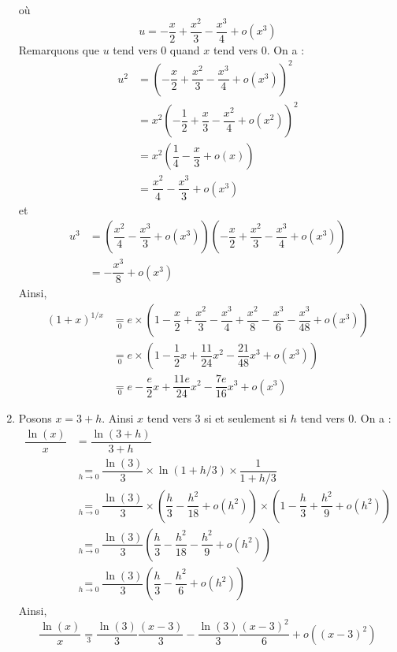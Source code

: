 \documentclass[a4paper,10pt]{report}
\begin{document}
\begin{enumerate}
 où 
 $$u = -\dfrac{x}{2} + \dfrac{x^2}{3} - \dfrac{x^3}{4} + o(x^3)$$
 Remarquons que $u$ tend vers $0$ quand $x$ tend vers $0$. On a :
 \begin{align*}
 u^2 & = \left(-\dfrac{x}{2} + \dfrac{x^2}{3} - \dfrac{x^3}{4} + o(x^3)\right)^2\\
 &  = x^2  \left(-\dfrac{1}{2} + \dfrac{x}{3} - \dfrac{x^2}{4} + o(x^2)\right)^2 \\
 & = x^2 \left( \dfrac{1}{4} - \dfrac{x}{3} + o(x) \right) \\
 & = \dfrac{x^2}{4} - \dfrac{x^3}{3} + o(x^3)
 \end{align*}
 et 
  \begin{align*}
 u^3 & =\left(\dfrac{x^2}{4} - \dfrac{x^3}{3} + o(x^3) \right) \left( -\dfrac{x}{2} + \dfrac{x^2}{3} - \dfrac{x^3}{4} + o(x^3) \right) \\
 & = - \dfrac{x^3}{8} + o(x^3) 
 \end{align*}
 Ainsi,
 \begin{align*}
 (1+x)^{1/x} & \underset{0}{=} e \times  \left(1 -\dfrac{x}{2} + \dfrac{x^2}{3} - \dfrac{x^3}{4} + \dfrac{x^2}{8} - \dfrac{x^3}{6} - \dfrac{x^3}{48} + o(x^3) \right) \\
 &  \underset{0}{=} e \times \left(1- \dfrac{1}{2}x + \dfrac{11}{24}x^2 - \dfrac{21}{48}x^3 + o(x^3) \right) \\
 & \underset{0}{=}  e- \dfrac{e}{2}x + \dfrac{11e}{24}x^2 - \dfrac{7e}{16}x^3 + o(x^3)
 \end{align*}
 \item Posons $x=3+h$. Ainsi $x$ tend vers $3$ si et seulement si $h$ tend vers $0$. On a :
 \begin{align*}
 \dfrac{\ln(x)}{x} & = \dfrac{\ln(3+h)}{3+h} \\
 &  \underset{h \rightarrow 0}{=} \dfrac{\ln(3)}{3} \times \ln(1+h/3) \times \dfrac{1}{1+h/3} \\
 & \underset{h \rightarrow 0}{=}  \dfrac{\ln(3)}{3} \times \left( \dfrac{h}{3} -\dfrac{h^2}{18}+ o(h^2) \right) \times \left(1- \dfrac{h}{3}+ \dfrac{h^2}{9}  + o(h^2) \right) \\
 & \underset{h \rightarrow 0}{=}\dfrac{\ln(3)}{3} \left( \dfrac{h}{3} -\dfrac{h^2}{18}  - \dfrac{h^2}{9}+o(h^2)\right)\\
  & \underset{h \rightarrow 0}{=}\dfrac{\ln(3)}{3} \left( \dfrac{h}{3} -\dfrac{h^2}{6}   +o(h^2)\right)
 \end{align*}
 Ainsi,
$$ \dfrac{\ln(x)}{x} \underset{3}{=} \dfrac{\ln(3)}{3}  \dfrac{(x-3)}{3} - \dfrac{\ln(3)}{3} \dfrac{(x-3)^2}{6}   +o((x-3)^2)$$

\end{enumerate}
\end{document}
